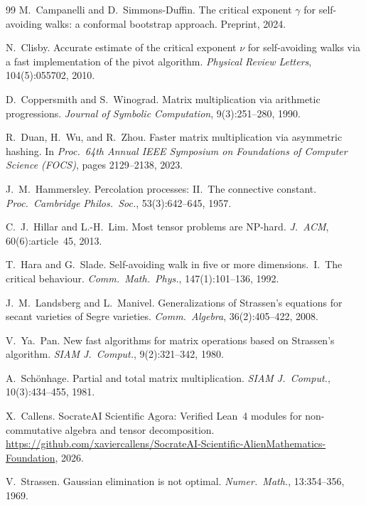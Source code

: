 \documentclass[11pt,a4paper]{article}
\theoremstyle{definition}
\theoremstyle{remark}
\begin{document}
\begin{thebibliography}{99}
M.~Campanelli and D.~Simmons-Duffin.
\newblock The critical exponent $\gamma$ for self-avoiding walks:
a conformal bootstrap approach.
\newblock Preprint, 2024.

N.~Clisby.
\newblock Accurate estimate of the critical exponent $\nu$ for
self-avoiding walks via a fast implementation of the pivot algorithm.
\newblock \emph{Physical Review Letters}, 104(5):055702, 2010.

D.~Coppersmith and S.~Winograd.
\newblock Matrix multiplication via arithmetic progressions.
\newblock \emph{Journal of Symbolic Computation}, 9(3):251--280, 1990.

R.~Duan, H.~Wu, and R.~Zhou.
\newblock Faster matrix multiplication via asymmetric hashing.
\newblock In \emph{Proc.\ 64th Annual IEEE Symposium on Foundations
of Computer Science (FOCS)}, pages 2129--2138, 2023.

J.~M.~Hammersley.
\newblock Percolation processes: II.\ The connective constant.
\newblock \emph{Proc.\ Cambridge Philos.\ Soc.}, 53(3):642--645, 1957.

C.~J.~Hillar and L.-H.~Lim.
\newblock Most tensor problems are NP-hard.
\newblock \emph{J.~ACM}, 60(6):article~45, 2013.

T.~Hara and G.~Slade.
\newblock Self-avoiding walk in five or more dimensions.\ I.\ The
critical behaviour.
\newblock \emph{Comm.\ Math.\ Phys.}, 147(1):101--136, 1992.

J.~M.~Landsberg and L.~Manivel.
\newblock Generalizations of Strassen's equations for secant varieties
of Segre varieties.
\newblock \emph{Comm.\ Algebra}, 36(2):405--422, 2008.

V.~Ya.~Pan.
\newblock New fast algorithms for matrix operations based on
Strassen's algorithm.
\newblock \emph{SIAM J.\ Comput.}, 9(2):321--342, 1980.

A.~Sch\"onhage.
\newblock Partial and total matrix multiplication.
\newblock \emph{SIAM J.\ Comput.}, 10(3):434--455, 1981.

X.~Callens.
\newblock SocrateAI Scientific Agora: Verified Lean~4 modules for
non-commutative algebra and tensor decomposition.
\newblock \url{https://github.com/xaviercallens/SocrateAI-Scientific-AlienMathematics-Foundation},
2026.

V.~Strassen.
\newblock Gaussian elimination is not optimal.
\newblock \emph{Numer.\ Math.}, 13:354--356, 1969.

\end{thebibliography}
\end{document}
